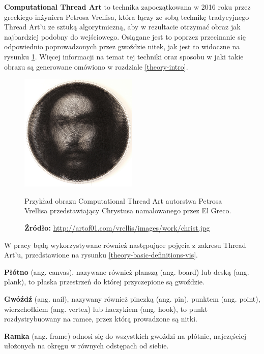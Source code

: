     \textbf{Computational Thread Art} to technika zapoczątkowana w 2016 roku przez greckiego inżyniera Petrosa Vrellisa, która łączy ze sobą technikę tradycyjnego Thread Art'u ze sztuką algorytmiczną, aby w rezultacie otrzymać obraz jak najbardziej podobny do wejściowego. Osiągane jest to poprzez przecinanie się odpowiednio poprowadzonych przez gwoździe nitek, jak jest to widoczne na rysunku \ref{theory-computational-thread-art}. Więcej informacji na temat tej techniki oraz sposobu w jaki takie obrazu są generowane omówiono w rozdziale \ref{theory-intro}.
    \begin{figure}[htb]
        \centering
        \includegraphics[width=0.5\textwidth,keepaspectratio]{img/2-theory/christs.png}
        \caption[Przykład obrazu Computational Thread Art.]{Przykład obrazu Computational Thread Art autorstwa Petrosa Vrellisa przedstawiający Chrystusa namalowanego przez El Greco.}
        \caption*{\footnotesize{\textbf{Źródło:} {\url{http://artof01.com/vrellis/images/work/christ.jpg}}}}
        \label{theory-computational-thread-art}
    \end{figure}
    
    W pracy będą wykorzystywane również następujące pojęcia z zakresu Thread Art'u, przedstawione na rysunku \ref{theory-basic-definitions-vis}.
    
    \textbf{Płótno} (ang. canvas), nazywane również planszą (ang. board) lub deską (ang. plank), to płaska przestrzeń do której przyczepione są gwoździe. 
    
    \textbf{Gwóźdź} (ang. nail), nazywany również pinezką (ang. pin), punktem (ang. point), wierzchołkiem (ang. vertex) lub haczykiem (ang. hook), to punkt rozdystrybuowany na ramce, przez którą prowadzone są nitki.
    
    \textbf{Ramka} (ang. frame) odnosi się do wszystkich gwoździ na płótnie, najczęściej ułożonych na okręgu w równych odstępach od siebie.
    
